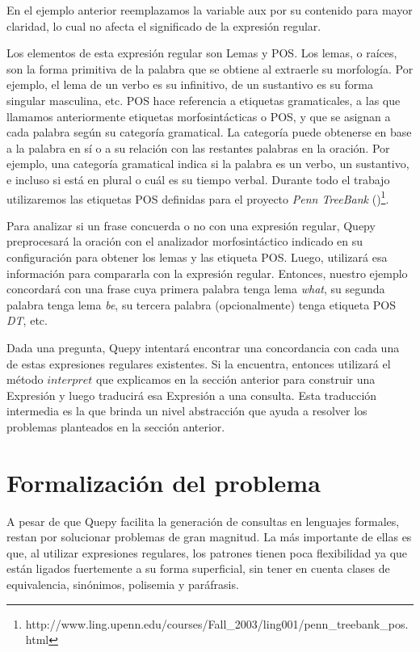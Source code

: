 En el ejemplo anterior reemplazamos la variable aux por su contenido para mayor claridad, lo cual no afecta el significado de la expresión regular.

Los elementos de esta expresión regular son Lemas y POS. Los lemas, o raíces, son la forma primitiva de la palabra que se obtiene al extraerle su morfología. Por ejemplo, el lema de un verbo es su infinitivo, de un sustantivo es su forma singular masculina, etc. POS hace referencia a etiquetas gramaticales, a las que llamamos anteriormente etiquetas morfosintácticas o POS, y que se asignan a cada palabra según su categoría gramatical. La categoría puede obtenerse en base a la palabra en sí o a su relación con las restantes palabras en la oración. Por ejemplo, una categoría gramatical indica si la palabra es un verbo, un sustantivo, e incluso si está en plural o cuál es su tiempo verbal. Durante todo el trabajo utilizaremos las etiquetas POS definidas para el proyecto \textit{Penn TreeBank} (\citet{penntreebank})\footnote{http://www.ling.upenn.edu/courses/Fall\_2003/ling001/penn\_treebank\_pos.html}.

Para analizar si un frase concuerda o no con una expresión regular, Quepy preprocesará la oración con el analizador morfosintáctico indicado en su configuración para obtener los lemas y las etiqueta POS. Luego, utilizará esa información para compararla con la expresión regular. Entonces, nuestro ejemplo concordará con una frase cuya primera palabra tenga lema \textit{what}, su segunda palabra tenga lema \textit{be}, su tercera palabra (opcionalmente) tenga etiqueta POS \textit{DT}, etc.

Dada una pregunta, Quepy intentará encontrar una concordancia con cada una de estas expresiones regulares existentes. Si la encuentra, entonces utilizará el método $interpret$ que explicamos en la sección anterior para construir una Expresión y luego traducirá esa Expresión a una consulta. Esta traducción intermedia es la que brinda un nivel abstracción que ayuda a resolver los problemas planteados en la sección anterior.

\chapter{Formalización del problema}

A pesar de que Quepy facilita la generación de consultas en lenguajes formales, restan por solucionar problemas de gran magnitud. La más importante de ellas es que, al utilizar expresiones regulares, los patrones tienen poca flexibilidad ya que están ligados fuertemente a su forma superficial, sin tener en cuenta clases de equivalencia, sinónimos, polisemia y paráfrasis.

